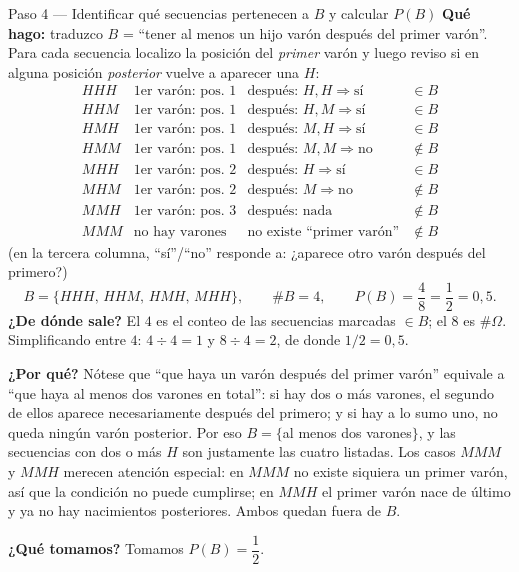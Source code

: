\documentclass[11pt]{article}
\begin{document}
\begin{sol}
\begin{paso}{Paso 4 --- Identificar qué secuencias pertenecen a $B$ y calcular $P(B)$}
\textbf{Qué hago:} traduzco $B$ = ``tener al menos un hijo varón después del primer varón''.
Para cada secuencia localizo la posición del \emph{primer} varón y luego reviso si en alguna
posición \emph{posterior} vuelve a aparecer una $H$:
\[
\begin{array}{lllc}
HHH & \text{1er varón: pos. 1} & \text{después: } H,H \Rightarrow \text{sí} & \in B\\
HHM & \text{1er varón: pos. 1} & \text{después: } H,M \Rightarrow \text{sí} & \in B\\
HMH & \text{1er varón: pos. 1} & \text{después: } M,H \Rightarrow \text{sí} & \in B\\
HMM & \text{1er varón: pos. 1} & \text{después: } M,M \Rightarrow \text{no} & \notin B\\
MHH & \text{1er varón: pos. 2} & \text{después: } H \Rightarrow \text{sí} & \in B\\
MHM & \text{1er varón: pos. 2} & \text{después: } M \Rightarrow \text{no} & \notin B\\
MMH & \text{1er varón: pos. 3} & \text{después: nada} & \notin B\\
MMM & \text{no hay varones} & \text{no existe ``primer varón''} & \notin B
\end{array}
\]
(en la tercera columna, ``sí''/``no'' responde a: ¿aparece otro varón después del primero?)
\[
B=\{HHH,\,HHM,\,HMH,\,MHH\},\qquad \#B=4,
\qquad
P(B)=\frac{4}{8}=\frac{1}{2}=0{,}5 .
\]
\textbf{¿De dónde sale?} El $4$ es el conteo de las secuencias marcadas $\in B$; el $8$ es
$\#\Omega$. Simplificando entre $4$: $4\div4=1$ y $8\div4=2$, de donde $1/2=0{,}5$.

\textbf{¿Por qué?} Nótese que ``que haya un varón después del primer varón'' equivale a
``que haya al menos dos varones en total'': si hay dos o más varones, el segundo de ellos
aparece necesariamente después del primero; y si hay a lo sumo uno, no queda ningún varón
posterior. Por eso $B=\{$al menos dos varones$\}$, y las secuencias con dos o más $H$ son
justamente las cuatro listadas. Los casos $MMM$ y $MMH$ merecen atención especial: en $MMM$
no existe siquiera un primer varón, así que la condición no puede cumplirse; en $MMH$ el
primer varón nace de último y ya no hay nacimientos posteriores. Ambos quedan fuera de $B$.

\textbf{¿Qué tomamos?} Tomamos $P(B)=\dfrac{1}{2}$.
\end{paso}


\end{sol}
\end{document}
